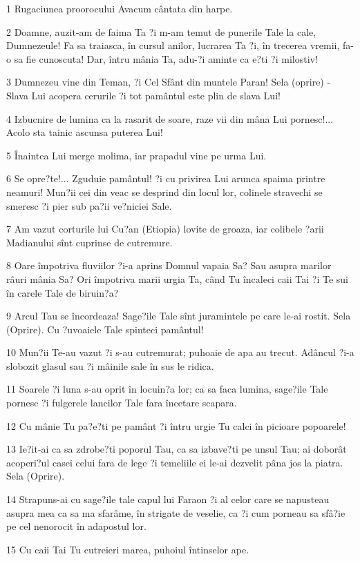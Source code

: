 \par 1 Rugaciunea proorocului Avacum cântata din harpe.
\par 2 Doamne, auzit-am de faima Ta ?i m-am temut de punerile Tale la cale, Dumnezeule! Fa sa traiasca, în cursul anilor, lucrarea Ta ?i, în trecerea vremii, fa-o sa fie cunoscuta! Dar, întru mânia Ta, adu-?i aminte ca e?ti ?i milostiv!
\par 3 Dumnezeu vine din Teman, ?i Cel Sfânt din muntele Paran! Sela (oprire) - Slava Lui acopera cerurile ?i tot pamântul este plin de slava Lui!
\par 4 Izbucnire de lumina ca la rasarit de soare, raze vii din mâna Lui pornesc!... Acolo sta tainic ascunsa puterea Lui!
\par 5 Înaintea Lui merge molima, iar prapadul vine pe urma Lui.
\par 6 Se opre?te!... Zguduie pamântul! ?i cu privirea Lui arunca spaima printre neamuri! Mun?ii cei din veac se desprind din locul lor, colinele stravechi se smeresc ?i pier sub pa?ii ve?niciei Sale.
\par 7 Am vazut corturile lui Cu?an (Etiopia) lovite de groaza, iar colibele ?arii Madianului sînt cuprinse de cutremure.
\par 8 Oare împotriva fluviilor ?i-a aprins Domnul vapaia Sa? Sau asupra marilor râuri mânia Sa? Ori împotriva marii urgia Ta, când Tu încaleci caii Tai ?i Te sui în carele Tale de biruin?a?
\par 9 Arcul Tau se încordeaza! Sage?ile Tale sînt juramintele pe care le-ai rostit. Sela (Oprire). Cu ?uvoaiele Tale spinteci pamântul!
\par 10 Mun?ii Te-au vazut ?i s-au cutremurat; puhoaie de apa au trecut. Adâncul ?i-a slobozit glasul sau ?i mâinile sale în sus le ridica.
\par 11 Soarele ?i luna s-au oprit în locuin?a lor; ca sa faca lumina, sage?ile Tale pornesc ?i fulgerele lancilor Tale fara încetare scapara.
\par 12 Cu mânie Tu pa?e?ti pe pamânt ?i întru urgie Tu calci în picioare popoarele!
\par 13 Ie?it-ai ca sa zdrobe?ti poporul Tau, ca sa izbave?ti pe unsul Tau; ai doborât acoperi?ul casei celui fara de lege ?i temeliile ei le-ai dezvelit pâna jos la piatra. Sela (Oprire).
\par 14 Strapuns-ai cu sage?ile tale capul lui Faraon ?i al celor care se napusteau asupra mea ca sa ma sfarâme, în strigate de veselie, ca ?i cum porneau sa sfâ?ie pe cel nenorocit în adapostul lor.
\par 15 Cu caii Tai Tu cutreieri marea, puhoiul întinselor ape.
